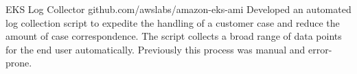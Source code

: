 \projectitem
{EKS Log Collector}
{github.com/awslabs/amazon-eks-ami}
{Developed an automated log collection script to expedite the handling of a customer case and reduce the amount of case correspondence. The script collects a broad range of data points for the end user automatically. Previously this process was manual and error-prone.}